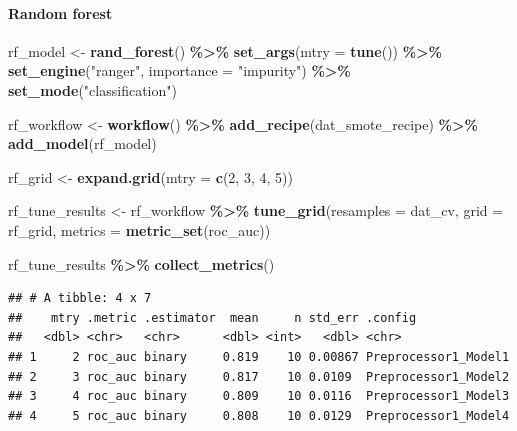 \documentclass[
]{article}
\newenvironment{Shaded}{\begin{snugshade}}{\end{snugshade}}
\newcommand{\AttributeTok}[1]{\textcolor[rgb]{0.13,0.29,0.53}{#1}}
\newcommand{\DecValTok}[1]{\textcolor[rgb]{0.00,0.00,0.81}{#1}}
\newcommand{\FunctionTok}[1]{\textcolor[rgb]{0.13,0.29,0.53}{\textbf{#1}}}
\newcommand{\NormalTok}[1]{#1}
\newcommand{\OtherTok}[1]{\textcolor[rgb]{0.56,0.35,0.01}{#1}}
\newcommand{\SpecialCharTok}[1]{\textcolor[rgb]{0.81,0.36,0.00}{\textbf{#1}}}
\newcommand{\StringTok}[1]{\textcolor[rgb]{0.31,0.60,0.02}{#1}}
\begin{document}
\paragraph{\texorpdfstring{\textbf{Random
forest}}{Random forest}}\label{random-forest}

\begin{Shaded}
\begin{Highlighting}[]
\NormalTok{rf\_model }\OtherTok{\textless{}{-}} \FunctionTok{rand\_forest}\NormalTok{() }\SpecialCharTok{\%\textgreater{}\%} \FunctionTok{set\_args}\NormalTok{(}\AttributeTok{mtry =} \FunctionTok{tune}\NormalTok{()) }\SpecialCharTok{\%\textgreater{}\%}
  \FunctionTok{set\_engine}\NormalTok{(}\StringTok{"ranger"}\NormalTok{, }\AttributeTok{importance =} \StringTok{"impurity"}\NormalTok{) }\SpecialCharTok{\%\textgreater{}\%}
  \FunctionTok{set\_mode}\NormalTok{(}\StringTok{"classification"}\NormalTok{) }


\NormalTok{rf\_workflow }\OtherTok{\textless{}{-}} \FunctionTok{workflow}\NormalTok{() }\SpecialCharTok{\%\textgreater{}\%}
  \FunctionTok{add\_recipe}\NormalTok{(dat\_smote\_recipe) }\SpecialCharTok{\%\textgreater{}\%}
  \FunctionTok{add\_model}\NormalTok{(rf\_model)}

\NormalTok{rf\_grid }\OtherTok{\textless{}{-}} \FunctionTok{expand.grid}\NormalTok{(}\AttributeTok{mtry =} \FunctionTok{c}\NormalTok{(}\DecValTok{2}\NormalTok{, }\DecValTok{3}\NormalTok{, }\DecValTok{4}\NormalTok{, }\DecValTok{5}\NormalTok{))}

\NormalTok{rf\_tune\_results }\OtherTok{\textless{}{-}}\NormalTok{ rf\_workflow }\SpecialCharTok{\%\textgreater{}\%} \FunctionTok{tune\_grid}\NormalTok{(}\AttributeTok{resamples =}\NormalTok{ dat\_cv, }\AttributeTok{grid =}\NormalTok{ rf\_grid, }\AttributeTok{metrics =} \FunctionTok{metric\_set}\NormalTok{(roc\_auc))}

\NormalTok{rf\_tune\_results }\SpecialCharTok{\%\textgreater{}\%}  \FunctionTok{collect\_metrics}\NormalTok{()}
\end{Highlighting}
\end{Shaded}

\begin{verbatim}
## # A tibble: 4 x 7
##    mtry .metric .estimator  mean     n std_err .config             
##   <dbl> <chr>   <chr>      <dbl> <int>   <dbl> <chr>               
## 1     2 roc_auc binary     0.819    10 0.00867 Preprocessor1_Model1
## 2     3 roc_auc binary     0.817    10 0.0109  Preprocessor1_Model2
## 3     4 roc_auc binary     0.809    10 0.0116  Preprocessor1_Model3
## 4     5 roc_auc binary     0.808    10 0.0129  Preprocessor1_Model4
\end{verbatim}
\end{document}
